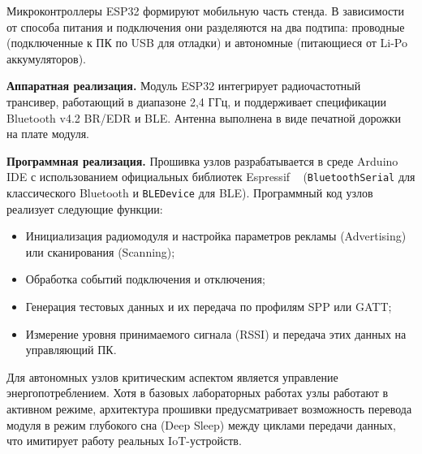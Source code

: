 Микроконтроллеры ESP32 формируют мобильную часть стенда. В зависимости от способа питания и подключения они разделяются на два подтипа: проводные (подключенные к ПК по USB для отладки) и автономные (питающиеся от Li-Po аккумуляторов).

\textbf{Аппаратная реализация.} Модуль ESP32 интегрирует радиочастотный трансивер, работающий в диапазоне 2,4 ГГц, и поддерживает спецификации Bluetooth v4.2 BR/EDR и BLE. Антенна выполнена в виде печатной дорожки на плате модуля.

\textbf{Программная реализация.} Прошивка узлов разрабатывается в среде Arduino IDE с использованием официальных библиотек Espressif ~\cite{esp_idf_bt_docs} (\texttt{BluetoothSerial} для классического Bluetooth и \texttt{BLEDevice} для BLE). Программный код узлов реализует следующие функции:
\begin{itemize}[nosep]
    \item Инициализация радиомодуля и настройка параметров рекламы (Advertising) или сканирования (Scanning);
    \item Обработка событий подключения и отключения;
    \item Генерация тестовых данных и их передача по профилям SPP или GATT;
    \item Измерение уровня принимаемого сигнала (RSSI) и передача этих данных на управляющий ПК.
\end{itemize}

Для автономных узлов критическим аспектом является управление энергопотреблением. Хотя в базовых лабораторных работах узлы работают в активном режиме, архитектура прошивки предусматривает возможность перевода модуля в режим глубокого сна (Deep Sleep) между циклами передачи данных, что имитирует работу реальных IoT-устройств.
